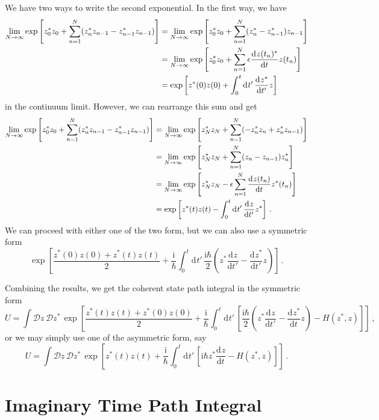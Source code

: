 \documentclass{article}
\theoremstyle{plain}\theoremheaderfont{\normalfont\itshape}\theorembodyfont{\rmfamily}\theoremseparator{.}\newtheorem*{rem}{Remark}\newtheorem*{ex}{Example}\newtheorem*{proof}{Proof}\newtheorem*{altp}{Alternative proof}
\theoremstyle{plain}\theoremheaderfont{\normalfont\bfseries}\theorembodyfont{\rmfamily}\theoremseparator{.}\newtheorem{thm}{Theorem}[section]\newtheorem{lem}[thm]{Lemma}\newtheorem{prop}[thm]{Proposition}\newtheorem*{cor}{Corollary}\newtheorem{defn}[thm]{Definition}\newtheorem{clm}[thm]{Claim}\newtheorem{clminproof}{Claim}
\theoremstyle{break}\theoremheaderfont{\normalfont\itshape}\theorembodyfont{\rmfamily}\theoremseparator{.\medskip}\newtheorem*{proofskip}{Proof}\newtheorem*{exs}{Examples}\newtheorem*{rems}{Remarks}
\theoremstyle{break}\theoremheaderfont{\normalfont\bfseries}\theorembodyfont{\rmfamily}\theoremseparator{.\medskip}\newtheorem{lemskip}[thm]{Lemma}\newtheorem{defnskip}[thm]{Definition}\newtheorem{propskip}[thm]{Proposition}\newtheorem{thmskip}[thm]{Theorem}
\numberwithin{equation}{section}
\newcommand{\ii}{\mathrm{i}}
\newcommand{\dd}[2][]{\mathrm{d}^{#1} #2\,}
\newcommand{\DD}[1]{\mathcal{D} #1\,}
\newcommand{\dv}[3][]{\frac{\mathrm{d}^{#1} #2}{{\mathrm{d} #3}^{#1}}}
\begin{document}
    We have two ways to write the second exponential. In the first way, we have
    \begin{align}
        \lim_{N\to\infty}\exp\left[z_0^* z_0+\sum_{n=1}^{N}(z_n^* z_{n-1} - z_{n-1}^* z_{n-1})\right] &= \lim_{N\to\infty}\exp\left[z_0^* z_0+\sum_{n=1}^{N}(z_n^* - z_{n-1}^*) z_{n-1}\right] \notag \\
        &=\lim_{N\to\infty}\exp\left[z_0^* z_0+\sum_{n=1}^{N}\epsilon\dv{z(t_n)^*}{t} z(t_n)\right] \notag \\
        &=\exp\left[z^*(0)z(0)+\int_{0}^{t}\dd{t'}\dv{z^*}{t'} z\right]
    \end{align}
    in the continuum limit. However, we can rearrange this sum and get
    \begin{align}
        \lim_{N\to\infty}\exp\left[z_0^* z_0+\sum_{n=1}^{N}(z_n^* z_{n-1} - z_{n-1}^* z_{n-1})\right] &=\lim_{N\to\infty}\exp\left[z_N^* z_N+\sum_{n=1}^{N}(-z_n^* z_{n} + z_{n}^* z_{n-1})\right]\notag \\
        &=\lim_{N\to\infty}\exp\left[z_N^* z_N+\sum_{n=1}^{N}(z_{n} - z_{n-1}) z_{n}^* \right]\notag \\
        &=\lim_{N\to\infty}\exp\left[z_N^* z_N - \epsilon\sum_{n=1}^{N}\dv{z(t_n)}{t}z^*(t_n)\right]\notag \\
        &=\exp\left[z^*(t)z(t)-\int_{0}^{t}\dd{t'}\dv{z}{t'} z^*\right]\,.
    \end{align}
    We can proceed with either one of the two form, but we can also use a symmetric form
    \begin{equation}
        \exp\left[\frac{z^*(0) z(0) + z^*(t) z(t)}{2}+\frac{\ii}{\hbar}\int_{0}^{t}\dd{t'}\frac{\ii\hbar}{2}\left(z^*\dv{z}{t'}-\dv{z^*}{t'}z\right)\right]\,.
    \end{equation}

    Combining the results, we get the coherent state path integral in the symmetric form
    \begin{equation}
        U=\int\DD{z}\DD{z^*}\exp\left[\frac{z^*(t)z(t)+z^*(0)z(0)}{2}+\frac{\ii}{\hbar}\int_{0}^{t}\dd{t'}\left[\frac{\ii\hbar}{2}\left(z^*\dv{z}{t'}-\dv{z^*}{t}z\right)-H(z^*,z)\right]\right]\,,
    \end{equation}
    or we may simply use one of the asymmetric form, say
    \begin{equation}
        U=\int\DD{z}\DD{z^*}\exp\left[z^*(t) z(t)+\frac{\ii}{\hbar}\int_0^t\dd{t'} \left[\ii\hbar z^*\dv{z}{t}-H(z^*,z)\right]\right]\,.
    \end{equation}

    

    \section{Imaginary Time Path Integral}
\end{document}
